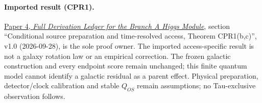 \documentclass[11pt]{article}
\begin{document}
\paragraph{Imported result (CPR1).}
\href{https://github.com/tau-core-research/tau-core-higgs-module-paper4/blob/main/paper4_full_derivation/full_derivation.pdf#nameddest=cpr1}{Paper 4, \emph{Full Derivation Ledger for the Branch A Higgs Module}}, section ``Conditional source preparation and time-resolved access, Theorem CPR1(b,c)'', v1.0 (2026-09-28), is the sole proof owner.
The imported access-specific result is not a galaxy rotation law or an empirical correction. The frozen galactic construction and every endpoint score remain unchanged; this finite quantum model cannot identify a galactic residual as a parent effect.
Physical preparation, detector/clock calibration and stable $Q_{OS}$ remain assumptions; no Tau-exclusive observation follows.
\end{document}
